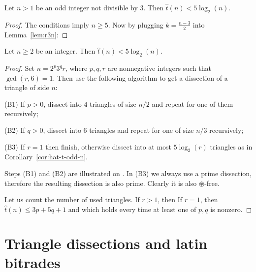 \begin{cor}
\label{cor:hat-t-odd-n}
Let $n > 1$ be an odd integer not divisible by 3. Then $\hat t(n) < 5\log_2(n)$.
\end{cor}
\begin{proof}
The conditions imply $n \geq 5$. Now by plugging $k = \frac{n-3}{2}$ into Lemma~\ref{lem:r3n}:
\end{proof}


\begin{thm}
\label{thm:t-log-bound}
Let $n \geq 2$ be an integer. Then $\hat t(n) < 5\log_2(n)$.
\end{thm}
\begin{proof}

Set $n = 2^p3^qr$, where $p,q,r$ are nonnegative integers such that $\gcd(r,6) = 1$. Then use the following algorithm to get a dissection of a triangle of side $n$:

\begin{cosyenumerate}
	\item[(B1)] If $p > 0$, dissect into 4 triangles of size $n/2$ and repeat for one of them recursively;
	\item[(B2)] If $q > 0$, dissect into 6 triangles and repeat for one of size $n/3$ recursively;
	\item[(B3)] If $r=1$ then finish, otherwise dissect into at most $5\log_2(r)$ triangles as in Corollary~\ref{cor:hat-t-odd-n}.
\end{cosyenumerate}

Steps (B1) and (B2) are illustrated on . In (B3) we always use a prime dissection, therefore the resulting dissection is also prime. Clearly it is also $\circledast$-free.

Let us count the number of used triangles. If $r > 1$, then
If $r=1$, then $\hat t(n) \leq 3p + 5q + 1$ and
which holds every time at least one of $p,q$ is nonzero.
\end{proof}

\section{Triangle dissections and latin bitrades}

